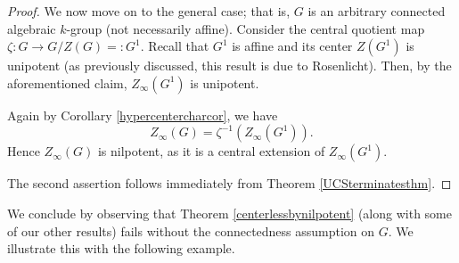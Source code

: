 \documentclass[twoside,a4paper,reqno,11pt]{amsart}
\theoremstyle{definition}
\newtheorem{remark}[theorem]{Remark}
\begin{document}
\begin{proof}
\vspace{2mm}\noindent We now move on to the general case; that is, $G$ is an arbitrary connected algebraic $k$-group (not necessarily affine). Consider the central quotient map $\zeta:G\to G/Z(G)=:G^1$. Recall that $G^1$ is affine and its center $Z(G^1)$ is unipotent (as previously discussed, this result is due to Rosenlicht). Then, by the aforementioned claim, $Z_\infty(G^1)$ is unipotent.

\vspace{2mm}\noindent Again by Corollary \ref{hypercentercharcor}, we have $$Z_\infty(G)=\zeta^{-1}(Z_\infty(G^1)).$$ Hence $Z_\infty(G)$ is nilpotent, as it is a central extension of $Z_\infty(G^1)$.

\vspace{2mm}\noindent The second assertion follows immediately from Theorem \ref{UCSterminatesthm}.
\end{proof}

\noindent We conclude by observing that Theorem \ref{centerlessbynilpotent} (along with some of our other results) fails without the connectedness assumption on $G$. We illustrate this with the following example. 
\end{document}
